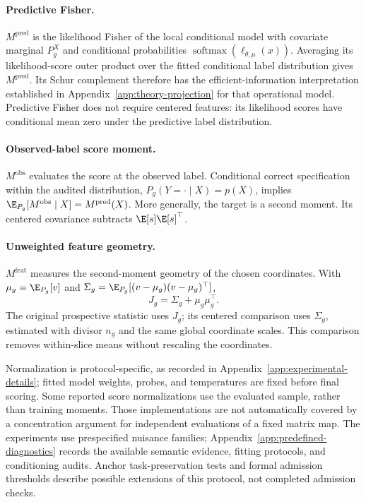 \paragraph{Predictive Fisher.}
$M^{\mathrm{pred}}$ is the likelihood Fisher of the local conditional model with covariate marginal $P_g^X$ and conditional probabilities $\operatorname{softmax}(\ell_{\theta,\mu}(x))$. Averaging its likelihood-score outer product over the fitted conditional label distribution gives $M^{\mathrm{pred}}$. Its Schur complement therefore has the efficient-information interpretation established in Appendix~\ref{app:theory-projection} for that operational model. Predictive Fisher does not require centered features: its likelihood scores have conditional mean zero under the predictive label distribution.

\paragraph{Observed-label score moment.}
$M^{\mathrm{obs}}$ evaluates the score at the observed label. Conditional correct specification within the audited distribution, $P_g(Y=\cdot\mid X)=p(X)$, implies $\E_{P_g}[M^{\mathrm{obs}}\mid X]=M^{\mathrm{pred}}(X)$. More generally, the target is a second moment. Its centered covariance subtracts $\E[s]\E[s]^\top$.

\paragraph{Unweighted feature geometry.}
$M^{\mathrm{feat}}$ measures the second-moment geometry of the chosen coordinates. With $\mu_g=\E_{P_g}[v]$ and $\Sigma_g=\E_{P_g}[(v-\mu_g)(v-\mu_g)^\top]$,
\[
J_g=\Sigma_g+\mu_g\mu_g^\top.
\]
The original prospective statistic uses $J_g$; its centered comparison uses $\Sigma_g$, estimated with divisor $n_g$ and the same global coordinate scales. This comparison removes within-slice means without rescaling the coordinates.

Normalization is protocol-specific, as recorded in Appendix~\ref{app:experimental-details}; fitted model weights, probes, and temperatures are fixed before final scoring. Some reported score normalizations use the evaluated sample, rather than training moments. Those implementations are not automatically covered by a concentration argument for independent evaluations of a fixed matrix map. The experiments use prespecified nuisance families; Appendix~\ref{app:predefined-diagnostics} records the available semantic evidence, fitting protocols, and conditioning audits. Anchor task-preservation tests and formal admission thresholds describe possible extensions of this protocol, not completed admission checks.


